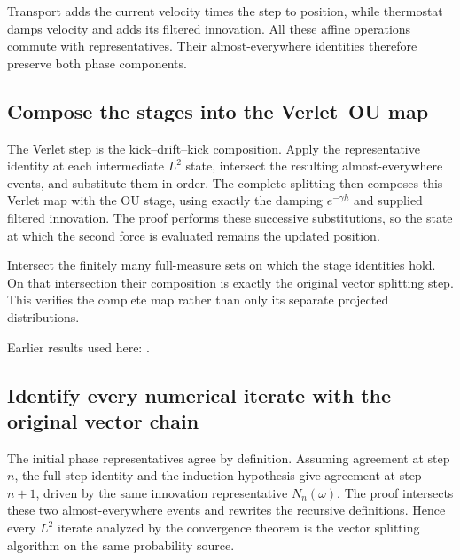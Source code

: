 \documentclass[11pt,a4paper]{report}
\begin{document}
Transport adds the current velocity times the step to position, while thermostat damps velocity and adds its filtered innovation. All these affine operations commute with representatives. Their almost-everywhere identities therefore preserve both phase components.

\subsection{\texorpdfstring{Compose the stages into the Verlet–OU map}{Compose the stages into the Verlet–OU map}}
\label{report-step-KineticLangevin-KineticSplittingLp-lean-4}


The Verlet step is the kick–drift–kick composition. Apply the representative identity at each intermediate \(L^{2}\) state, intersect the resulting almost-everywhere events, and substitute them in order. The complete splitting then composes this Verlet map with the OU stage, using exactly the damping \(e^{-\gamma h}\) and supplied filtered innovation. The proof performs these successive substitutions, so the state at which the second force is evaluated remains the updated position.



Intersect the finitely many full-measure sets on which the stage identities hold. On that intersection their composition is exactly the original vector splitting step. This verifies the complete map rather than only its separate projected distributions.



Earlier results used here: \cite[Section~3.13.2]{LangevinLean2026ULASC}.
\subsection{\texorpdfstring{Identify every numerical iterate with the original vector chain}{Identify every numerical iterate with the original vector chain}}
\label{report-step-KineticLangevin-KineticSplittingLp-lean-5}


The initial phase representatives agree by definition. Assuming agreement at step \(n\), the full-step identity and the induction hypothesis give agreement at step \(n+1\), driven by the same innovation representative \(N_n(\omega)\). The proof intersects these two almost-everywhere events and rewrites the recursive definitions. Hence every \(L^{2}\) iterate analyzed by the convergence theorem is the vector splitting algorithm on the same probability source.
\end{document}
